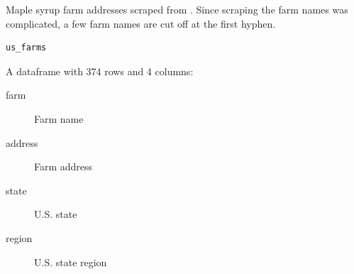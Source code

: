 %
\begin{Description}
Maple syrup farm addresses scraped from
. Since scraping
the farm names was complicated, a few farm names are cut off at the first
hyphen.
\end{Description}
%
\begin{Usage}
\begin{verbatim}
us_farms
\end{verbatim}
\end{Usage}
%
\begin{Format}
%
\begin{SubSection}{}

A dataframe with 374 rows and 4 columns:
\begin{description}

\item[farm] Farm name
\item[address] Farm address
\item[state] U.S. state
\item[region] U.S. state region

\end{description}

\end{SubSection}

\end{Format}
